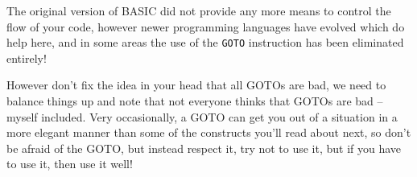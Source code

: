 The original version of BASIC did not provide any more means to
control the flow of your code, however newer programming languages have
evolved which do help here, and in some areas the use of the {\tt GOTO}
instruction has been eliminated entirely!

However don't fix the idea in your head that all GOTOs are bad, we
need to balance things up and note that not everyone thinks that GOTOs
are bad -- myself included. Very occasionally, a GOTO can get you out
of a situation in a more elegant manner than some of the constructs
you'll read about next, so don't be afraid of the GOTO, but instead
respect it, try not to use it, but if you have to
use it, then use it well!
